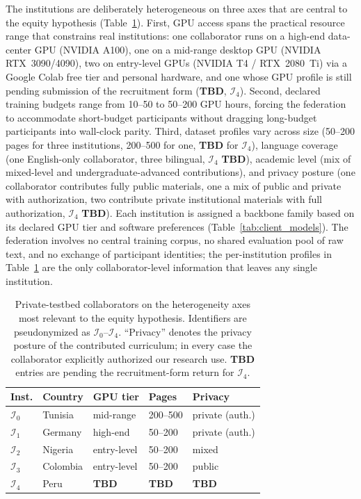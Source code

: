 \documentclass[11pt]{article}
\theoremstyle{plain}
\theoremstyle{definition}
\theoremstyle{remark}
\newcommand{\red}[1]{\textcolor{myred}{\textbf{#1}}}
\begin{document}
The institutions are deliberately heterogeneous on
three axes that are central to the equity
hypothesis (Table~\ref{tab:private_collaborators}).
First, GPU access spans the practical resource
range that constrains real institutions: one
collaborator runs on a high-end data-center GPU
(NVIDIA A100), one on a mid-range desktop GPU
(NVIDIA RTX~3090/4090), two on entry-level GPUs
(NVIDIA T4 / RTX~2080~Ti) via a Google Colab free
tier and personal hardware, and one whose GPU
profile is still pending submission of the
recruitment form (\red{TBD}, $\mathcal{I}_4$). Second, declared
training budgets range from 10--50 to 50--200 GPU
hours, forcing the federation to accommodate
short-budget participants without dragging
long-budget participants into wall-clock parity.
Third, dataset profiles vary across size (50--200
pages for three institutions, 200--500 for one,
\red{TBD} for $\mathcal{I}_4$), language coverage
(one English-only collaborator, three bilingual,
$\mathcal{I}_4$ \red{TBD}), academic level (mix of
mixed-level and undergraduate-advanced
contributions), and privacy posture (one
collaborator contributes fully public materials,
one a mix of public and private with
authorization, two contribute private institutional
materials with full authorization, $\mathcal{I}_4$
\red{TBD}). Each
institution is assigned a backbone family based on
its declared GPU tier and software preferences
(Table~\ref{tab:client_models}). The federation
involves no central training corpus, no shared
evaluation pool of raw text, and no exchange of
participant identities; the per-institution
profiles in Table~\ref{tab:private_collaborators}
are the only collaborator-level information that
leaves any single institution.

\begin{table}[t]
\centering
\footnotesize
\setlength{\tabcolsep}{3pt}
\caption{Private-testbed collaborators on the
heterogeneity axes most relevant to the equity
hypothesis. Identifiers are pseudonymized as
$\mathcal{I}_0$--$\mathcal{I}_4$. ``Privacy''
denotes the privacy posture of the contributed
curriculum; in every case the collaborator
explicitly authorized our research use.
\red{TBD} entries are pending the recruitment-form
return for $\mathcal{I}_4$.}
\label{tab:private_collaborators}
\begin{tabular}{@{}lllll@{}}
\toprule
\textbf{Inst.} & \textbf{Country} & \textbf{GPU tier}
& \textbf{Pages} & \textbf{Privacy} \\
\midrule
$\mathcal{I}_0$ & Tunisia  & mid-range   & 200--500 & private (auth.) \\
$\mathcal{I}_1$ & Germany  & high-end    & 50--200  & private (auth.) \\
$\mathcal{I}_2$ & Nigeria  & entry-level & 50--200  & mixed \\
$\mathcal{I}_3$ & Colombia & entry-level & 50--200  & public \\
$\mathcal{I}_4$ & Peru     & \red{TBD}   & \red{TBD} & \red{TBD} \\
\bottomrule
\end{tabular}
\end{table}
\end{document}
